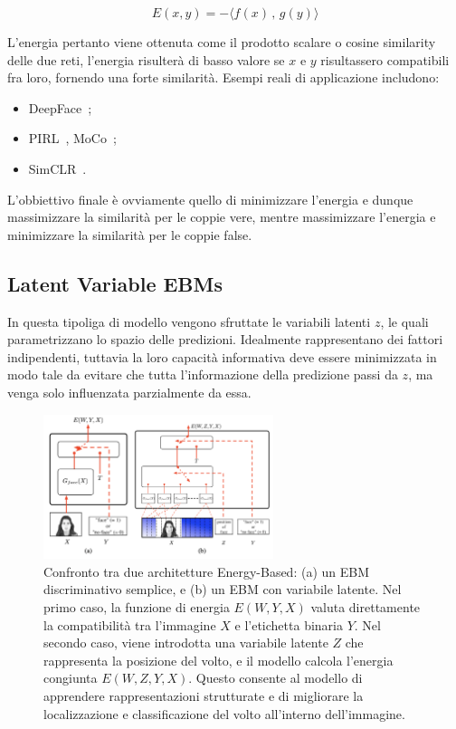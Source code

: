 \begin{equation}
    E(x,y) = - \langle f(x)\,,\,g(y)\rangle
\end{equation}

L'energia pertanto viene ottenuta come il prodotto scalare o cosine similarity delle due reti, l'energia risulterà di basso valore se $x$ e $y$ risultassero compatibili fra loro, fornendo una forte similarità. Esempi reali di applicazione includono:
\begin{itemize}
    \item DeepFace~\cite{taigman2014deepface};
    \item PIRL~\cite{misra2019pirl}, MoCo~\cite{he2019moco};
    \item SimCLR~\cite{chen2020simclr}.
\end{itemize}

L'obbiettivo finale è ovviamente quello di minimizzare l'energia e dunque massimizzare la similarità per le coppie vere, mentre massimizzare l'energia e minimizzare la similarità per le coppie false.

\subsection{Latent Variable EBMs}
In questa tipoliga di modello vengono sfruttate le variabili latenti $z$, le quali parametrizzano lo spazio delle predizioni. Idealmente rappresentano dei fattori indipendenti, tuttavia la loro capacità informativa deve essere minimizzata in modo tale da evitare che tutta l'informazione della predizione passi da $z$, ma venga solo influenzata parzialmente da essa.

\begin{figure}
    \centering
    \includegraphics[width=0.6\textwidth]{figure/ebm-face.png}
    \caption{Confronto tra due architetture Energy-Based: (a) un EBM discriminativo semplice, e (b) un EBM con variabile latente. 
    Nel primo caso, la funzione di energia $E(W, Y, X)$ valuta direttamente la compatibilità tra l'immagine $X$ e l'etichetta binaria $Y$. Nel secondo caso, viene introdotta una variabile latente $Z$ che rappresenta la posizione del volto, e il modello calcola l'energia congiunta $E(W, Z, Y, X)$. Questo consente al modello di apprendere rappresentazioni strutturate e di migliorare la localizzazione e classificazione del volto all'interno dell'immagine.}
    \label{fig:ebm-face}
\end{figure}

